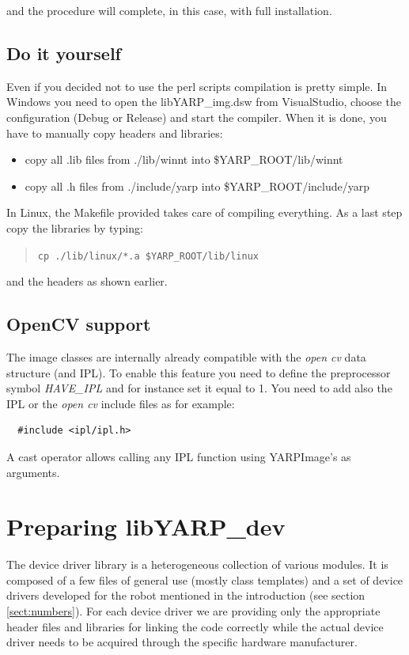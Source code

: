 \noindent and the procedure will complete, in this case, with full installation.


\subsection{Do it yourself}
Even if you decided not to use the perl scripts compilation is pretty simple. In Windows you need to open the libYARP\_img.dsw from VisualStudio, choose the configuration (Debug or Release) and start the compiler. When it is done, you have to manually copy headers and libraries:
\begin{itemize}
\item copy all .lib files from ./lib/winnt into \$YARP\_ROOT/lib/winnt
\item copy all .h files from ./include/yarp into \$YARP\_ROOT/include/yarp
\end{itemize}

In Linux, the Makefile provided takes care of compiling everything. As a last step copy the libraries by typing:
\begin{quote}
{\tt cp ./lib/linux/*.a \$YARP\_ROOT/lib/linux}
\end{quote}

\noindent and the headers as shown earlier. 


\subsection{OpenCV support}
The image classes are internally already compatible with the {\em open cv} data structure (and IPL). To enable this feature you need to define the preprocessor symbol {\em HAVE\_IPL} and for instance set it equal to 1. You need to add also the IPL or the {\em open cv} include files as for example:

\begin{verbatim}
  #include <ipl/ipl.h>
\end{verbatim}

A cast operator allows calling any IPL function using YARPImage's as arguments.
 
  
\section{Preparing libYARP\_dev}
The device driver library is a heterogeneous collection of various modules. It is composed of a few files of general use (mostly class templates) and a set of device drivers developed for the robot mentioned in the introduction (see section \ref{sect:numbers}). For each device driver we are providing only the appropriate header files and libraries for linking the code correctly while the actual device driver needs to be acquired through the specific hardware manufacturer.

